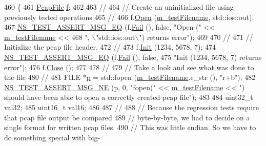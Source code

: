 \begin{DoxyCode}
460 \{
461   \hyperlink{classns3_1_1PcapFile}{PcapFile} \hyperlink{buildings__pathloss_8m_aa52d3a6e3de5a80a97c12364caeaa125}{f};
462 
463   \textcolor{comment}{//}
464   \textcolor{comment}{// Create an uninitialized file using previously tested operations}
465   \textcolor{comment}{//}
466   f.\hyperlink{classns3_1_1PcapFile_a064e8494e28e823d0bb4e40549f9f483}{Open} (\hyperlink{classFileHeaderTestCase_a4ab3078ae75680fcc90a3eca9f273cd2}{m\_testFilename}, std::ios::out);
467   \hyperlink{group__testing_ga2a9d78cffb3db8e867c35fff0b698cf5}{NS\_TEST\_ASSERT\_MSG\_EQ} (f.\hyperlink{classns3_1_1PcapFile_a2e00aa080890a0c9c3e9f5bd2d6c21d5}{Fail} (), \textcolor{keyword}{false}, \textcolor{stringliteral}{"Open ("} << 
      \hyperlink{classFileHeaderTestCase_a4ab3078ae75680fcc90a3eca9f273cd2}{m\_testFilename} << 
468                          \textcolor{stringliteral}{", \(\backslash\)"std::ios::out\(\backslash\)") returns error"});
469 
470   \textcolor{comment}{//}
471   \textcolor{comment}{// Initialize the pcap file header.}
472   \textcolor{comment}{//}
473   f.\hyperlink{classns3_1_1PcapFile_a80c8adea1baa66e3f730df2927b0fc9b}{Init} (1234, 5678, 7);
474   \hyperlink{group__testing_ga2a9d78cffb3db8e867c35fff0b698cf5}{NS\_TEST\_ASSERT\_MSG\_EQ} (f.\hyperlink{classns3_1_1PcapFile_a2e00aa080890a0c9c3e9f5bd2d6c21d5}{Fail} (), \textcolor{keyword}{false}, 
475                          \textcolor{stringliteral}{"Init (1234, 5678, 7) returns error"});
476   f.\hyperlink{classns3_1_1PcapFile_ad3b6c28d464742ee1fa3a64628339a5b}{Close} ();
477 
478   \textcolor{comment}{//}
479   \textcolor{comment}{// Take a look and see what was done to the file}
480   \textcolor{comment}{//}
481   FILE *\hyperlink{lte__link__budget_8m_ac9de518908a968428863f829398a4e62}{p} = std::fopen (\hyperlink{classFileHeaderTestCase_a4ab3078ae75680fcc90a3eca9f273cd2}{m\_testFilename}.c\_str (), \textcolor{stringliteral}{"r+b"});
482   \hyperlink{group__testing_ga73d66fb0050a5111453fd144e767b91a}{NS\_TEST\_ASSERT\_MSG\_NE} (p, 0, \textcolor{stringliteral}{"fopen("} << \hyperlink{classFileHeaderTestCase_a4ab3078ae75680fcc90a3eca9f273cd2}{m\_testFilename} << \textcolor{stringliteral}{") should
       have been able to open a correctly created pcap file"});
483 
484   uint32\_t val32;
485   uint16\_t val16;
486 
487   \textcolor{comment}{//}
488   \textcolor{comment}{// Because the regression tests require that pcap file output be compared }
489   \textcolor{comment}{// byte-by-byte, we had to decide on a single format for written pcap files.}
490   \textcolor{comment}{// This was little endian.  So we have to do something special with big-}

\end{DoxyCode}
